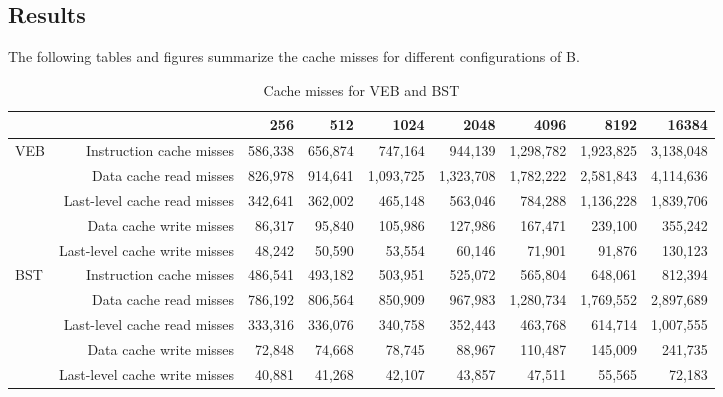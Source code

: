 \subsection{Results}
The following tables and figures summarize the cache misses for different configurations of B.
\begin{table}[h!]
    \centering
    {\small
    \begin{tabular}{lrrrrrrrr}
        \toprule
        & & 256 & 512 & 1024 & 2048 & 4096 & 8192 & 16384 \\
        \midrule
        \multirow{5}{*}{VEB}
        & Instruction cache misses & 586,338 & 656,874 & 747,164 & 944,139 & 1,298,782 & 1,923,825 & 3,138,048 \\
        & Data cache read misses & 826,978 & 914,641 & 1,093,725 & 1,323,708 & 1,782,222 & 2,581,843 & 4,114,636 \\
        & Last-level cache read misses & 342,641 & 362,002 & 465,148 & 563,046 & 784,288 & 1,136,228 & 1,839,706 \\
        & Data cache write misses & 86,317 & 95,840 & 105,986 & 127,986 & 167,471 & 239,100 & 355,242 \\
        & Last-level cache write misses & 48,242 & 50,590 & 53,554 & 60,146 & 71,901 & 91,876 & 130,123 \\
        \midrule
        \multirow{5}{*}{BST}
        & Instruction cache misses & 486,541 & 493,182 & 503,951 & 525,072 & 565,804 & 648,061 & 812,394 \\
        & Data cache read misses & 786,192 & 806,564 & 850,909 & 967,983 & 1,280,734 & 1,769,552 & 2,897,689 \\
        & Last-level cache read misses & 333,316 & 336,076 & 340,758 & 352,443 & 463,768 & 614,714 & 1,007,555 \\
        & Data cache write misses & 72,848 & 74,668 & 78,745 & 88,967 & 110,487 & 145,009 & 241,735 \\
        & Last-level cache write misses & 40,881 & 41,268 & 42,107 & 43,857 & 47,511 & 55,565 & 72,183 \\
        \bottomrule
    \end{tabular}
    }
    \caption{Cache misses for VEB and BST}
\end{table}

